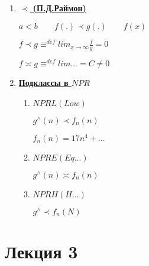 \documentclass[12pt]{report}
\begin{document}
\begin{enumerate}
\begin{enumerate}
		\end{enumerate}
		\item \underline{\textbf{$\prec$ (П.Д.Раймон)}}\par
		$a<b\qquad f(.)\prec g(.)\qquad f(x)$\par
		$f\prec g\equiv^{def} lim_{x\rightarrow \infty} \frac{f}{g}=0$\par
		$f \asymp g \equiv^{def}lim...=C\neq 0$\par
		\item \underline{\textbf{Подклассы в $NPR$}}
		\begin{enumerate}
			\item $ NPRL(Low)$\par
			$g^{\wedge}(n) \prec f_{n}(n)$\par
			$f_{n}(n)=17n^{4}+...$
			\item $NPRE(Eq...)$\par
			$g^{\wedge}(n)\asymp f_{n}(n)$
			\item $NPRH(H...)$\par
			$g^{\wedge}\prec f_{n}(N)$\par
		\end{enumerate}
	\end{enumerate}	

	\chapter*{Лекция 3}
\end{document}
